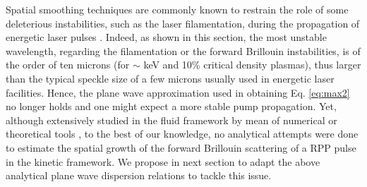 \documentclass[
 reprint,
 superscriptaddress,
 amsmath,amssymb,
 aps,
]{revtex4-1}
\begin{document}
Spatial smoothing techniques are commonly known to restrain the role of some deleterious instabilities, such as the laser filamentation, during the propagation of energetic laser pulses  \cite[]{Kato_1984,NatPhys_Glenzer,POP_Berger_98b}. Indeed, as shown in this section, the most unstable wavelength, regarding the filamentation or the forward Brillouin instabilities, is of the order of ten   microns (for $\sim$ keV and 10\% critical density plasmas), thus larger than the typical  speckle size   of a few microns   usually used in energetic laser facilities.  
Hence, the plane wave approximation used in obtaining Eq. \eqref{eq:max2} no longer holds and one might expect a more stable pump propagation.
Yet, although extensively studied in the fluid framework by mean of numerical or theoretical tools \cite[]{POP_Schmitt_Afeyan_98,POP_Hinkel_1998,PRL_Myatt_2001,POP_Maximov_2001,Lushnikov_2006,phd-Grech,POP_Grech_2006,PRL_Grech_2009}, to the best of our knowledge, no analytical attempts were done to estimate the spatial growth of the forward Brillouin scattering of a RPP pulse in the kinetic framework. 
We propose in next section to adapt the above analytical plane wave dispersion relations  to tackle this issue.
\end{document}
